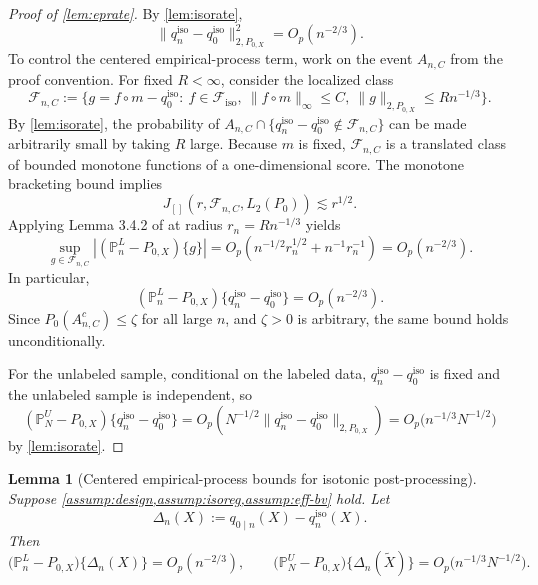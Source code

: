 \documentclass{article}
\theoremstyle{plain}
\newtheorem{lemma}{Lemma}
\theoremstyle{definition}
\newcommand{\1}{\mathbf{1}}
\newcommand{\mhat}{m}
\newcommand{\Pl}{\mathbb{P}^{L}_n}
\newcommand{\Pu}{\mathbb{P}^{U}_N}
\newcommand{\Px}{P_{0,X}}
\begin{document}
\begin{proof}[Proof of \cref{lem:eprate}]
By \cref{lem:isorate},
\[
\|q_n^{\mathrm{iso}}-q_0^{\mathrm{iso}}\|_{2,\Px}^2=O_p(n^{-2/3}).
\]
To control the centered empirical-process term, work on the event \(A_{n,C}\) from the proof convention. For fixed \(R<\infty\), consider the localized class
\[
\mathcal F_{n,C}
:=
\{g=f\circ\mhat-q_0^{\mathrm{iso}}:\ f\in\mathcal F_{\mathrm{iso}},\ \|f\circ\mhat\|_\infty\le C,\ \|g\|_{2,\Px}\le Rn^{-1/3}\}.
\]
By \cref{lem:isorate}, the probability of \(A_{n,C}\cap\{q_n^{\mathrm{iso}}-q_0^{\mathrm{iso}}\notin\mathcal F_{n,C}\}\) can be made arbitrarily small by taking \(R\) large. Because \(\mhat\) is fixed, \(\mathcal F_{n,C}\) is a translated class of bounded monotone functions of a one-dimensional score. The monotone bracketing bound implies
\[
J_{[]}\!\left(r,\mathcal F_{n,C},L_2(P_0)\right)\lesssim r^{1/2}.
\]
Applying Lemma 3.4.2 of \citet{vdvwellner1996} at radius \(r_n=Rn^{-1/3}\) yields
\[
\sup_{g\in\mathcal F_{n,C}} |(\Pl-\Px)\{g\}|
=
O_p\!\left(n^{-1/2}r_n^{1/2}+n^{-1}r_n^{-1}\right)
=
O_p(n^{-2/3}).
\]
In particular,
\[
(\Pl-\Px)\{q_n^{\mathrm{iso}}-q_0^{\mathrm{iso}}\}=O_p(n^{-2/3}).
\]
Since \(P_0(A_{n,C}^c)\le \zeta\) for all large \(n\), and \(\zeta>0\) is arbitrary, the same bound holds unconditionally.

For the unlabeled sample, conditional on the labeled data, \(q_n^{\mathrm{iso}}-q_0^{\mathrm{iso}}\) is fixed and the unlabeled sample is independent, so
\[
(\Pu-\Px)\{q_n^{\mathrm{iso}}-q_0^{\mathrm{iso}}\}
=
O_p\left(N^{-1/2}\|q_n^{\mathrm{iso}}-q_0^{\mathrm{iso}}\|_{2,\Px}\right)
=
O_p\bigl(n^{-1/3}N^{-1/2}\bigr)
\]
by \cref{lem:isorate}.
\end{proof}

\begin{lemma}[Centered empirical-process bounds for isotonic post-processing]
\label{lem:post-eprate}
Suppose \cref{assump:design,assump:isoreg,assump:eff-bv} hold. Let
\[
\Delta_n(X):=q_{0\mid n}(X)-q_n^{\mathrm{iso}}(X).
\]
Then
\[
\bigl(\Pl-\Px\bigr)\{\Delta_n(X)\}=O_p(n^{-2/3}),
\qquad
\bigl(\Pu-\Px\bigr)\{\Delta_n(\widetilde X)\}=O_p\bigl(n^{-1/3}N^{-1/2}\bigr).
\]
\end{lemma}
\end{document}
